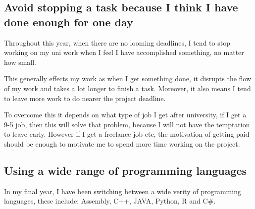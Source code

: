 \documentclass{scrartcl}
\begin{document}
\subsection{Avoid stopping a task because I think I have done enough for one day}

Throughout this year, when there are no looming deadlines, I tend to stop working on my uni work when I feel I have accomplished something, no matter how small.

This generally effects my work as when I get something done, it disrupts the flow of my work and takes a lot longer to finish a task. Moreover, it also means I tend to leave more work to do nearer the project deadline.

To overcome this it depends on what type of job I get after university, if I get a 9-5 job, then this will solve that problem, because I will not have the temptation to leave early. However if I get a freelance job etc, the motivation of getting paid should be enough to motivate me to spend more time working on the project.
\par



\subsection{Using a wide range of programming languages}
In my final year, I have been switching between a wide verity of programming languages, these include:
Assembly, C++, JAVA, Python, R and C\#.



\par




%
\subsection{ }





\par






%



\end{document}
